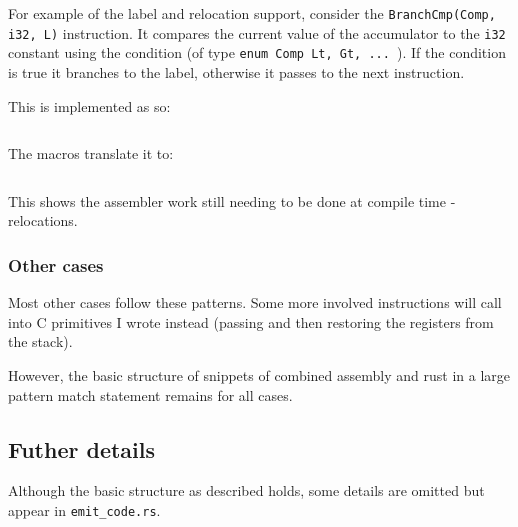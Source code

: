 For example of the label and relocation support, consider the \texttt{BranchCmp(Comp, i32, L)}
instruction. It
compares the current value of the accumulator to the \texttt{i32} constant using the condition (of
type \texttt{enum Comp {Lt, Gt, ... }}). If the condition is true it branches to the label,
otherwise it passes to the next instruction.

This is implemented as so:

\inputminted{rust}{snippets/branchcmp.rs}

The macros translate it to:

\inputminted{rust}{snippets/branchcmp_comp.rs}

This shows the assembler work still needing to be done at compile time - relocations.

\subsubsection{Other cases}

Most other cases follow these patterns. Some more involved instructions will call into C primitives
I wrote instead (passing and then restoring the registers from the stack).

However, the basic structure of snippets of combined assembly and rust in a large pattern match
statement remains for all cases.

\subsection{Futher details}

Although the basic structure as described holds, some details are omitted but appear in
\texttt{emit\_code.rs}.

